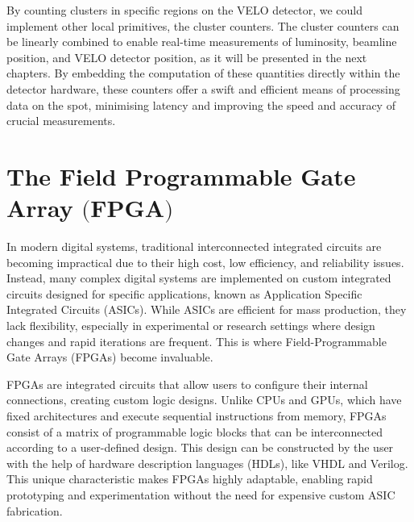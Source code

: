 By counting clusters in specific regions on the VELO detector, we could implement other local primitives, the cluster counters. The cluster counters can be linearly combined to enable real-time measurements of luminosity, beamline position, and VELO detector position, as it will be presented in the next chapters. By embedding the computation of these quantities directly within the detector hardware, these counters offer a swift and efficient means of processing data on the spot, minimising latency and improving the speed and accuracy of crucial measurements. 

\section[The Field Programmable Gate Array]{The Field Programmable Gate Array $\bigl($FPGA$\bigr)$}

In modern digital systems, traditional interconnected integrated circuits are becoming impractical due to their high cost, low efficiency, and reliability issues. Instead, many complex digital systems are implemented on custom integrated circuits designed for specific applications, known as Application Specific Integrated Circuits (ASICs). While ASICs are efficient for mass production, they lack flexibility, especially in experimental or research settings where design changes and rapid iterations are frequent. This is where Field-Programmable Gate Arrays (FPGAs) become invaluable.

FPGAs are integrated circuits that allow users to configure their internal connections, creating custom logic designs. Unlike CPUs and GPUs, which have fixed architectures and execute sequential instructions from memory, FPGAs consist of a matrix of programmable logic blocks that can be interconnected according to a user-defined design. This design can be constructed by the user with the help of hardware description languages (HDLs), like VHDL and Verilog. This unique characteristic makes FPGAs highly adaptable, enabling rapid prototyping and experimentation without the need for expensive custom ASIC fabrication.

